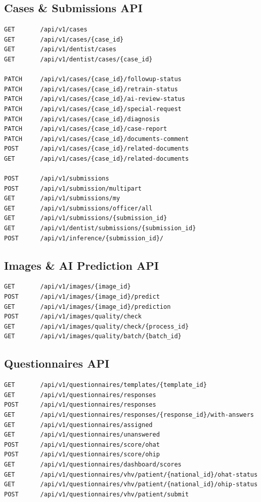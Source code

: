 \subsection*{Cases \& Submissions API}
\begin{verbatim}
GET       /api/v1/cases
GET       /api/v1/cases/{case_id}
GET       /api/v1/dentist/cases
GET       /api/v1/dentist/cases/{case_id}

PATCH     /api/v1/cases/{case_id}/followup-status
PATCH     /api/v1/cases/{case_id}/retrain-status
PATCH     /api/v1/cases/{case_id}/ai-review-status
PATCH     /api/v1/cases/{case_id}/special-request
PATCH     /api/v1/cases/{case_id}/diagnosis
PATCH     /api/v1/cases/{case_id}/case-report
PATCH     /api/v1/cases/{case_id}/documents-comment
POST      /api/v1/cases/{case_id}/related-documents
GET       /api/v1/cases/{case_id}/related-documents

POST      /api/v1/submissions
POST      /api/v1/submission/multipart
GET       /api/v1/submissions/my
GET       /api/v1/submissions/officer/all
GET       /api/v1/submissions/{submission_id}
GET       /api/v1/dentist/submissions/{submission_id}
POST      /api/v1/inference/{submission_id}/
\end{verbatim}

\subsection*{Images \& AI Prediction API}
\begin{verbatim}
GET       /api/v1/images/{image_id}
POST      /api/v1/images/{image_id}/predict
GET       /api/v1/images/{image_id}/prediction
POST      /api/v1/images/quality/check
GET       /api/v1/images/quality/check/{process_id}
GET       /api/v1/images/quality/batch/{batch_id}
\end{verbatim}

\subsection*{Questionnaires API}
\begin{verbatim}
GET       /api/v1/questionnaires/templates/{template_id}
GET       /api/v1/questionnaires/responses
POST      /api/v1/questionnaires/responses
GET       /api/v1/questionnaires/responses/{response_id}/with-answers
GET       /api/v1/questionnaires/assigned
GET       /api/v1/questionnaires/unanswered
POST      /api/v1/questionnaires/score/ohat
POST      /api/v1/questionnaires/score/ohip
GET       /api/v1/questionnaires/dashboard/scores
GET       /api/v1/questionnaires/vhv/patient/{national_id}/ohat-status
GET       /api/v1/questionnaires/vhv/patient/{national_id}/ohip-status
POST      /api/v1/questionnaires/vhv/patient/submit
\end{verbatim}

